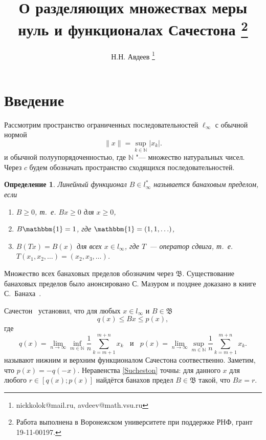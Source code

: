 \documentclass[a4paper,14pt]{article} %
\theoremstyle{plain}
\newtheorem{definition}[lemma]{Определение}
\begin{document}

\title{
	О разделяющих множествах меры нуль и функционалах Сачестона
	\footnote{
		Работа выполнена в Воронежском университете при поддержке РНФ, грант 19-11-00197.
	}
}

\author{
	Н.Н. Авдеев
	\footnote{nickkolok@mail.ru, avdeev@math.vsu.ru}
}

\maketitle

\section{Введение}

Рассмотрим пространство ограниченных последовательностей $\ell_\infty$ с обычной нормой
\begin{equation*}
	\|x\| = \sup_{k\in\mathbb{N}} |x_k|
	.
\end{equation*}
и обычной полуупорядоченностью, где $\mathbb{N}$ "--- множество натуральных чисел.
Через $c$ будем обозначать пространство сходящихся последовательностей.


\begin{definition}
	Линейный функционал $B\in l_\infty^*$ называется банаховым пределом,
	если
	\begin{enumerate}
		\item
			$B\geq0$, т.~е. $Bx \geq 0$ для $x \geq 0$,
		\item
			$B\mathbbm{1}=1$, где $\mathbbm{1} =(1,1,\ldots)$,
		\item
			$B(Tx)=B(x)$ для всех $x\in l_\infty$, где $T$~---
		оператор сдвига, т.~е. $T(x_1,x_2,\ldots)=(x_2,x_3,\ldots)$.
	\end{enumerate}
\end{definition}
Множество всех банаховых пределов обозначим через $\mathfrak{B}$.
Существование банаховых пределов было анонсировано С. Мазуром \cite{Mazur} и позднее доказано в книге С.~Банаха~\cite{B}. 


Сачестон~\cite{sucheston1967banach} установил, что
для любых $x\in l_\infty$ и $B\in\mathfrak{B}$
\begin{equation}\label{Sucheston}
	q(x) \leqslant Bx \leqslant p(x)
	,
\end{equation}
где
\begin{equation*}
	q(x) = \lim_{n\to\infty} \inf_{m\in\mathbb{N}}  \frac{1}{n} \sum_{k=m+1}^{m+n} x_k
	~~~~\mbox{и}~~~~
	p(x) = \lim_{n\to\infty} \sup_{m\in\mathbb{N}}  \frac{1}{n} \sum_{k=m+1}^{m+n} x_k
	.
\end{equation*}
называют нижним и верхним функционалом Сачестона соотвественно.
Заметим, что $p(x) = -q(-x)$.
Неравенства \eqref{Sucheston} точны:
для данного $x$ для любого $r\in[q(x); p(x)]$ найдётся банахов предел
$B\in\mathfrak{B}$ такой, что $Bx = r$.
\end{document}
